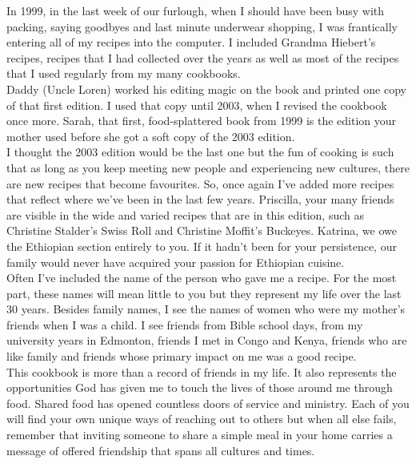 \documentclass[letterpaper, 12pt]{memoir} %
\begin{document}
In 1999, in the last week of our furlough, when I should have been busy with   packing, saying goodbyes and last minute underwear shopping, I was frantically entering all of my recipes into the computer. I included Grandma Hiebert's recipes, recipes that I had collected over the years as well as most of the recipes that I used regularly from my many cookbooks. \\[10pt]

Daddy (Uncle Loren) worked his editing magic on the book and printed one copy of that first edition. I used that copy until 2003, when I revised the cookbook once more. Sarah, that first, food-splattered book from 1999 is the edition your mother used before she got a soft copy of the 2003 edition. \\[10pt]

I thought the 2003 edition would be the last one but the fun of cooking is such that as long as you keep meeting new people and experiencing new cultures, there are new recipes that become favourites. So, once again I've added more recipes that reflect where we've been in the last few years. Priscilla, your many friends are visible in the wide and varied recipes that are in this edition, such as Christine Stalder's Swiss Roll and Christine Moffit's Buckeyes. Katrina, we owe the Ethiopian section entirely to you. If it hadn't been for your persistence, our family would never have acquired your passion for Ethiopian cuisine. \\[10pt]

Often I've included the name of the person who gave me a recipe. For the most part, these names will mean little to you but they represent my life over the last 30 years. Besides family names, I see the names of women who were my mother's friends when I was a child. I see friends from Bible school days, from my university years in Edmonton, friends I met in Congo and Kenya, friends who are like family and friends whose primary impact on me was a good recipe. \\[10pt]

This cookbook is more than a record of friends in my life. It also represents the opportunities God has given me to touch the lives of those around me through food. Shared food has opened countless doors of service and ministry. Each of you will find your own unique ways of reaching out to others but when all else fails, remember that inviting someone to share a simple meal in your home carries a message of offered friendship that spans all cultures and times. \\[10pt]
\end{document}
